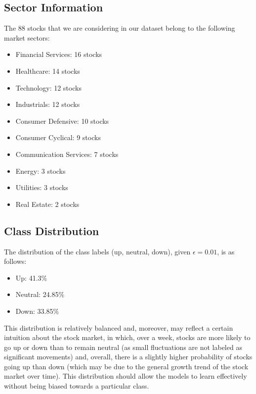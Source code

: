 \documentclass{article}
\begin{document}
\begin{appendix}
    \subsection{Sector Information}
    \label{appendix:sector_information}

    The 88 stocks that we are considering in our dataset belong to the following market sectors:
    \begin{itemize}
        \item Financial Services: 16 stocks
        \item Healthcare: 14 stocks
        \item Technology: 12 stocks
        \item Industrials: 12 stocks
        \item Consumer Defensive: 10 stocks
        \item Consumer Cyclical: 9 stocks
        \item Communication Services: 7 stocks
        \item Energy: 3 stocks
        \item Utilities: 3 stocks
        \item Real Estate: 2 stocks
    \end{itemize}

    \subsection{Class Distribution}
    \label{appendix:class_distribution}

    The distribution of the class labels (up, neutral, down), given $\epsilon = 0.01$, is as follows:
    \begin{itemize}
        \item Up: 41.3\%
        \item Neutral: 24.85\%
        \item Down: 33.85\%
    \end{itemize}

    This distribution is relatively balanced and, moreover, may reflect a certain intuition about the stock market, in which, over a week, stocks are more likely to go up or down than to remain neutral (as small fluctuations are not labeled as significant movements) and, overall, there is a slightly higher probability of stocks going up than down (which may be due to the general growth trend of the stock market over time). This distribution should allow the models to learn effectively without being biased towards a particular class.

\end{appendix}
\end{document}
